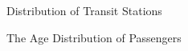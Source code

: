 \documentclass[Journal,letterpaper]{ascelike-new}
\begin{document}
\begin{figure}[htp]
\caption{Distribution of Transit Stations}
\label{fig:1}
\centering
{}
\end{figure}
%
\begin{figure}[htp]
\caption{The Age Distribution of Passengers}
\label{fig:2}
\centering
{}
\end{figure}
%
\end{document}
